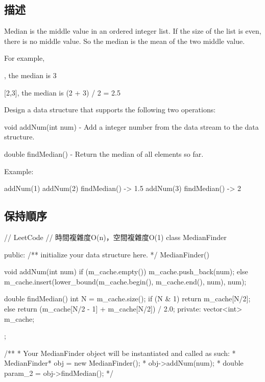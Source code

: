 \subsection{描述}
Median is the middle value in an ordered integer list. If the size of the list is even, there is no middle value. So the median is the mean of the two middle value.

For example,
\begin{Code}
[2,3,4], the median is 3

[2,3], the median is (2 + 3) / 2 = 2.5
\end{Code}

Design a data structure that supports the following two operations:

\begindot
\item void addNum(int num) - Add a integer number from the data stream to the data structure.
\item double findMedian() - Return the median of all elements so far.
\myenddot

Example:
\begin{Code}
addNum(1)
addNum(2)
findMedian() -> 1.5
addNum(3) 
findMedian() -> 2
\end{Code}

\subsection{保持順序}
\begin{Code}
// LeetCode
// 時間複雜度O(n)，空間複雜度O(1)
class MedianFinder {
public:
    /** initialize your data structure here. */
    MedianFinder() {

    }

    void addNum(int num) {
        if (m_cache.empty())
            m_cache.push_back(num);
        else
            m_cache.insert(lower_bound(m_cache.begin(), m_cache.end(), num), num);
    }

    double findMedian() {
        int N = m_cache.size();
        if (N & 1)
            return m_cache[N/2];
        else
            return (m_cache[N/2 - 1] + m_cache[N/2]) / 2.0;
    }
private:
    vector<int> m_cache;
};

/**
 * Your MedianFinder object will be instantiated and called as such:
 * MedianFinder* obj = new MedianFinder();
 * obj->addNum(num);
 * double param_2 = obj->findMedian();
 */
\end{Code}

